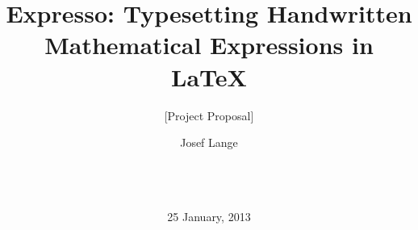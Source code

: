 \documentclass{acm_proc_article-sp}
\begin{document}
\title{ Expresso: Typesetting Handwritten Mathematical Expressions in LaTeX }
\subtitle{[Project Proposal]}
%
%
%
%
%

%
\author{
%
%
\alignauthor
Josef Lange\\
       \\
       \\
       \\
       }
\date{25 January, 2013}

\maketitle
\end{document}
